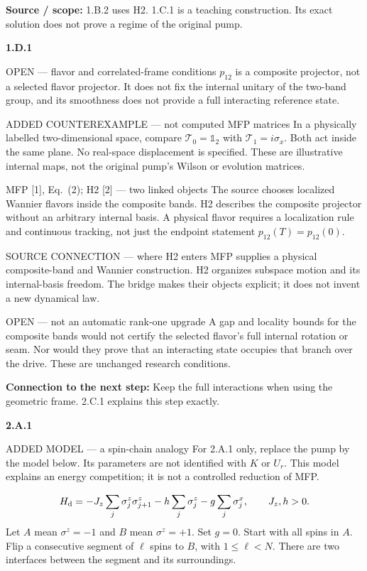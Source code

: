 \documentclass[11pt,a4paper]{article}
\newcommand{\id}{\mathds 1}
\begin{document}
{\footnotesize\textbf{Source / scope:} 1.B.2 uses H2. 1.C.1 is a teaching construction. Its exact solution does not prove a regime of the original pump.}\par
\par\medskip\textbf{1.D.1}\par
\begin{redbox}{OPEN --- flavor and correlated-frame conditions}
$p_{12}$ is a composite projector, not a selected flavor projector. It does not fix the internal unitary of the two-band group, and its smoothness does not provide a full interacting reference state.
\end{redbox}
\begin{redbox}{ADDED COUNTEREXAMPLE --- not computed MFP matrices}
In a physically labelled two-dimensional space, compare $\mathscr T_0=\id_2$ with $\mathscr T_1=i\sigma_x$. Both act inside the same plane. No real-space displacement is specified. These are illustrative internal maps, not the original pump's Wilson or evolution matrices.
\end{redbox}
\begin{greenbox}{MFP [1], Eq.~(2); H2 [2] --- two linked objects}
The source chooses localized Wannier flavors inside the composite bands. H2 describes the composite projector without an arbitrary internal basis. A physical flavor requires a localization rule and continuous tracking, not just the endpoint statement $p_{12}(T)=p_{12}(0)$.
\end{greenbox}
\begin{greenbox}{SOURCE CONNECTION --- where H2 enters}
MFP supplies a physical composite-band and Wannier construction. H2 organizes subspace motion and its internal-basis freedom. The bridge makes their objects explicit; it does not invent a new dynamical law.
\end{greenbox}
\begin{redbox}{OPEN --- not an automatic rank-one upgrade}
A gap and locality bounds for the composite bands would not certify the selected flavor's full internal rotation or seam. Nor would they prove that an interacting state occupies that branch over the drive. These are unchanged research conditions.
\end{redbox}
{\small\textbf{Connection to the next step:} Keep the full interactions when using the geometric frame. 2.C.1 explains this step exactly.}\par
\par\medskip\textbf{2.A.1}\par
\begin{redbox}{ADDED MODEL --- a spin-chain analogy}
For 2.A.1 only, replace the pump by the model below. Its parameters are not identified with $K$ or $U_r$. This model explains an energy competition; it is not a controlled reduction of MFP.

\[
H_{\rm d}=-J_z\sum_j\sigma_j^z\sigma_{j+1}^z
-h\sum_j\sigma_j^z-g\sum_j\sigma_j^x,
\qquad J_z,h>0.
\]
Let $A$ mean $\sigma^z=-1$ and $B$ mean $\sigma^z=+1$. Set $g=0$. Start with all spins in $A$. Flip a consecutive segment of $\ell$ spins to $B$, with $1\leq\ell<N$. There are two interfaces between the segment and its surroundings.

\end{redbox}
\end{document}
